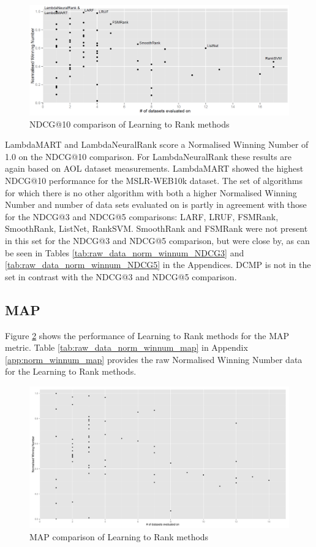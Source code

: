 \begin{figure}[!h]
\includegraphics[scale=0.285]{gfx/ndcg10_winnum}
\caption{\acs{NDCG}@10 comparison of Learning to Rank methods}
\label{fig:normalised_winning_number_NDCG10}
\end{figure}

LambdaMART and LambdaNeuralRank score a Normalised Winning Number of 1.0 on the \ac{NDCG}@10 comparison. For LambdaNeuralRank these results are again based on AOL dataset measurements. LambdaMART showed the highest \ac{NDCG}@10 performance for the MSLR-WEB10k dataset. The set of algorithms for which there is no other algorithm with both a higher Normalised Winning Number and number of data sets evaluated on is partly in agreement with those for the \ac{NDCG}@3 and \ac{NDCG}@5 comparisons: {LARF, LRUF, FSMRank, SmoothRank, ListNet, RankSVM}. SmoothRank and FSMRank were not present in this set for the \ac{NDCG}@3 and \ac{NDCG}@5 comparison, but were close by, as can be seen in Tables \ref{tab:raw_data_norm_winnum_NDCG3} and \ref{tab:raw_data_norm_winnum_NDCG5} in the Appendices. DCMP is not in the set in contrast with the \ac{NDCG}@3 and \ac{NDCG}@5 comparison.

\subsection{MAP}
Figure \ref{fig:normalised_winning_number_map} shows the performance of Learning to Rank methods for the \ac{MAP} metric. Table \ref{tab:raw_data_norm_winnum_map} in Appendix \ref{app:norm_winnum_map} provides the raw Normalised Winning Number data for the Learning to Rank methods.\\

\begin{figure}[!h]
\includegraphics[scale=0.285]{gfx/map_winnum}
\caption{\acs{MAP} comparison of Learning to Rank methods}
\label{fig:normalised_winning_number_map}
\end{figure}

